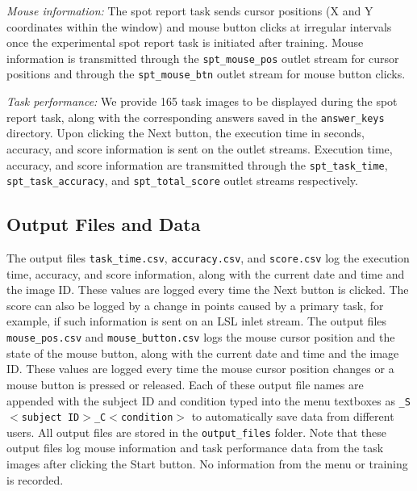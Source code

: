 \documentclass[preprint,12pt, a4paper]{elsarticle}
\begin{document}
\textit{Mouse information:} The spot report task sends cursor positions (X and Y coordinates within the window) and mouse button clicks at irregular intervals once the experimental spot report task is initiated after training. Mouse information is transmitted through the \texttt{spt\_mouse\_pos} outlet stream for cursor positions and through the \texttt{spt\_mouse\_btn} outlet stream for mouse button clicks.

\vspace{2mm}

\textit{Task performance:} We provide 165 task images to be displayed during the spot report task, along with the corresponding answers saved in the \texttt{answer\_keys} directory. Upon clicking the Next button, the execution time in seconds, accuracy, and score information is sent on the outlet streams. Execution time, accuracy, and score information are transmitted through the \texttt{spt\_task\_time}, \texttt{spt\_task\_accuracy}, and \texttt{spt\_total\_score} outlet streams respectively.  


\subsection{Output Files and Data}
The output files \texttt{task\_time.csv}, \texttt{accuracy.csv}, and \texttt{score.csv} log the execution time, accuracy, and score information, along with the current date and time and the image ID. These values are logged every time the Next button is clicked. The score can also be logged by a change in points caused by a primary task, for example, if such information is sent on an LSL inlet stream. The output files \texttt{mouse\_pos.csv} and \texttt{mouse\_button.csv} logs the mouse cursor position and the state of the mouse button, along with the current date and time and the image ID. These values are logged every time the mouse cursor position changes or a mouse button is pressed or released. Each of these output file names are appended with the subject ID and condition typed into the menu textboxes as \texttt{\_S$<$subject ID$>$\_C$<$condition$>$} to automatically save data from different users. All output files are stored in the \texttt{output\_files} folder. Note that these output files log mouse information and task performance data from the task images after clicking the Start button. No information from the menu or training is recorded.
\end{document}
